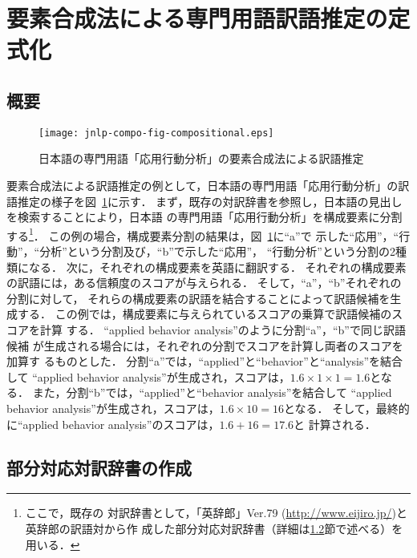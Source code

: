 \documentclass[japanese]{jnlp_1.3a}
\begin{document}
\section{要素合成法による専門用語訳語推定の定式化}
\label{sec:compo-method}

\subsection{概要}

\begin{figure}[b]
 \centering
     \texttt{[image: jnlp-compo-fig-compositional.eps]}
 \caption{日本語の専門用語「応用行動分析」の要素合成法による訳語推定}
 \label{fig:compositional}
\end{figure}

要素合成法による訳語推定の例として，日本語の専門用語「応用行動分析」の訳
語推定の様子を図~\ref{fig:compositional}に示す．
まず，既存の対訳辞書を参照し，日本語の見出しを検索することにより，日本語
の専門用語「応用行動分析」を構成要素に分割する\footnote{ここで，既存の
対訳辞書として，「英辞郎」Ver.79 (\url{http://www.eijiro.jp/})と英辞郎の訳語対から作
成した部分対応対訳辞書（詳細は\ref{sec:bcl}節で述べる）を用いる．}．
この例の場合，構成要素分割の結果は，図~\ref{fig:compositional}に``a''で
示した“応用”，“行動”，“分析”という分割及び，``b''で示した“応用”，
“行動分析”という分割の2種類になる．
次に，それぞれの構成要素を英語に翻訳する．
それぞれの構成要素の訳語には，ある信頼度のスコアが与えられる．
そして，``a''，``b''それぞれの分割に対して，
それらの構成要素の訳語を結合することによって訳語候補を生成する．
この例では，構成要素に与えられているスコアの乗算で訳語候補のスコアを計算
する．
``applied behavior analysis''のように分割``a''，``b''で同じ訳語候補
が生成される場合には，それぞれの分割でスコアを計算し両者のスコアを加算す
るものとした．
分割``a''では，``applied''と``behavior''と``analysis''を結合して
``applied behavior analysis''が生成され，スコアは，$1.6 \times 1 \times
1 = 1.6$となる．
また，分割``b''では，``applied''と``behavior analysis''を結合して
``applied behavior analysis''が生成され，スコアは，$1.6 \times 10=16$となる．
そして，最終的に``applied behavior analysis''のスコアは，$1.6+16=17.6$と
計算される．



\subsection{部分対応対訳辞書の作成}
\label{sec:bcl}
\end{document}
